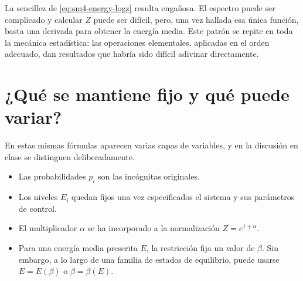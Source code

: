 La sencillez de \eqref{eq:sm4-energy-logz} resulta engañosa. El espectro puede ser complicado y calcular \(Z\) puede ser difícil, pero, una vez hallada esa única función, basta una derivada para obtener la energía media. Este patrón se repite en toda la mecánica estadística: las operaciones elementales, aplicadas en el orden adecuado, dan resultados que habría sido difícil adivinar directamente.

\begin{classroomqa}\end{classroomqa}

\begin{classroomqa}\end{classroomqa}

\section{¿Qué se mantiene fijo y qué puede variar?}

En estas mismas fórmulas aparecen varias capas de variables, y en la discusión en clase se distinguen deliberadamente.

\begin{itemize}\item Las probabilidades \(p_i\) son las incógnitas originales.
 \item Los niveles \(E_i\) quedan fijos una vez especificados el sistema y sus parámetros de control.
 \item El multiplicador \(\alpha\) se ha incorporado a la normalización \(Z=e^{1+\alpha}\).
 \item Para una energía media prescrita \(E\), la restricción fija un valor de \(\beta\). Sin embargo, a lo largo de una familia de estados de equilibrio, puede usarse \(E=E(\beta)\) o \(\beta=\beta(E)\).
\end{itemize}

